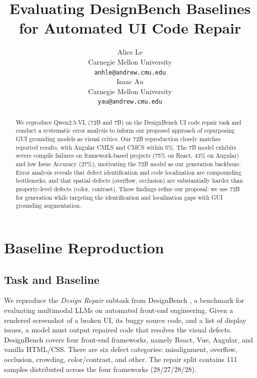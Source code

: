 \documentclass[11pt]{article}
\title{Evaluating DesignBench Baselines for Automated UI Code Repair}
\author{Alice Le \\
  Carnegie Mellon University \\
  \texttt{anhle@andrew.cmu.edu} \\\And
  Isaac Au \\
  Carnegie Mellon University \\
  \texttt{yau@andrew.cmu.edu} \\}
\begin{document}
\maketitle

\begin{abstract}
We reproduce Qwen2.5-VL (72B and 7B) on the DesignBench UI code repair task and conduct a systematic error analysis to inform our proposed approach of repurposing GUI grounding models as visual critics. Our 72B reproduction closely matches reported results, with Angular CMLS and CMCS within 5\%. The 7B model exhibits severe compile failures on framework-based projects (75\% on React, 43\% on Angular) and low Issue Accuracy (27\%), motivating the 72B model as our generation backbone. Error analysis reveals that defect identification and code localization are compounding bottlenecks, and that spatial defects (overflow, occlusion) are substantially harder than property-level defects (color, contrast). These findings refine our proposal: we use 72B for generation while targeting the identification and localization gaps with GUI grounding augmentation.
\end{abstract}


\section{Baseline Reproduction}
\label{sec:baseline}

\subsection{Task and Baseline}

We reproduce the \textit{Design Repair} subtask from DesignBench \cite{designbench2025}, a benchmark for evaluating multimodal LLMs on automated front-end engineering. Given a rendered screenshot of a broken UI, its buggy source code, and a list of display issues, a model must output repaired code that resolves the visual defects. DesignBench covers four front-end frameworks, namely React, Vue, Angular, and vanilla HTML/CSS. There are six defect categories: misalignment, overflow, occlusion, crowding, color/contrast, and other. The repair split contains 111 samples distributed across the four frameworks (28/27/28/28).
 
\end{document}
